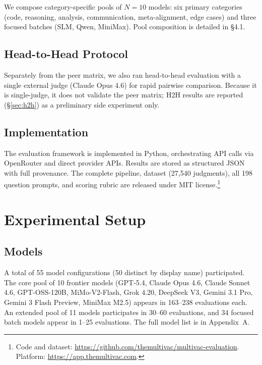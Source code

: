 \documentclass{article}
\begin{document}
We compose category-specific pools of $N = 10$ models: six primary categories (code, reasoning, analysis, communication, meta-alignment, edge cases) and three focused batches (SLM, Qwen, MiniMax). Pool composition is detailed in \S4.1.

\subsection{Head-to-Head Protocol}

Separately from the peer matrix, we also ran head-to-head evaluation with a single external judge (Claude Opus 4.6) for rapid pairwise comparison. Because it is single-judge, it does not validate the peer matrix; H2H results are reported (\S\ref{sec:h2h}) as a preliminary side experiment only.

\subsection{Implementation}

The evaluation framework is implemented in Python, orchestrating API calls via OpenRouter and direct provider APIs. Results are stored as structured JSON with full provenance. The complete pipeline, dataset (27,540 judgments), all 198 question prompts, and scoring rubric are released under MIT license.\footnote{Code and dataset: \url{https://github.com/themultivac/multivac-evaluation}. Platform: \url{https://app.themultivac.com}.}


\section{Experimental Setup}

\subsection{Models}

A total of 55 model configurations (50 distinct by display name) participated. The core pool of 10 frontier models (GPT-5.4, Claude Opus 4.6, Claude Sonnet 4.6, GPT-OSS-120B, MiMo-V2-Flash, Grok 4.20, DeepSeek V3, Gemini 3.1 Pro, Gemini 3 Flash Preview, MiniMax M2.5) appears in 163--238 evaluations each. An extended pool of 11 models participates in 30--60 evaluations, and 34 focused batch models appear in 1--25 evaluations. The full model list is in Appendix~A.
\end{document}
